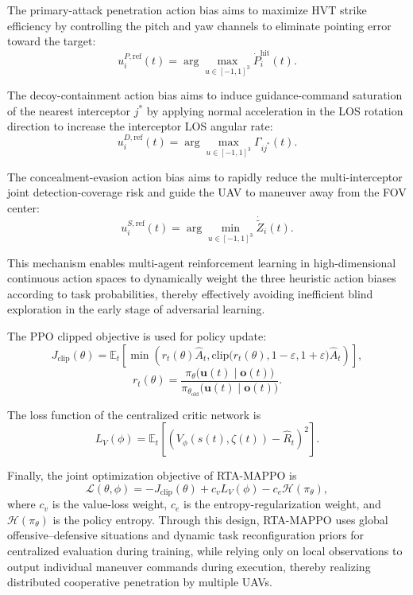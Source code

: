 \documentclass{cja}
\begin{document}
The primary-attack penetration action bias aims to maximize HVT strike efficiency by controlling the pitch and yaw channels to eliminate pointing error toward the target:
\begin{equation}
u_i^{P,\mathrm{ref}}(t) = \arg\max_{u \in [-1,1]^3} \dot{P}_i^{\mathrm{hit}}(t).
\end{equation}

The decoy-containment action bias aims to induce guidance-command saturation of the nearest interceptor $j^*$ by applying normal acceleration in the LOS rotation direction to increase the interceptor LOS angular rate:
\begin{equation}
u_i^{D,\mathrm{ref}}(t) = \arg\max_{u \in [-1,1]^3} \Gamma_{ij^*}(t).
\end{equation}

The concealment-evasion action bias aims to rapidly reduce the multi-interceptor joint detection-coverage risk and guide the UAV to maneuver away from the FOV center:
\begin{equation}
u_i^{S,\mathrm{ref}}(t) = \arg\min_{u \in [-1,1]^3} \dot{\widetilde Z}_i(t).
\end{equation}

This mechanism enables multi-agent reinforcement learning in high-dimensional continuous action spaces to dynamically weight the three heuristic action biases according to task probabilities, thereby effectively avoiding inefficient blind exploration in the early stage of adversarial learning.

The PPO clipped objective is used for policy update:
\begin{equation}
J_{\mathrm{clip}}(\theta)
=
\mathbb E_t
\left[
\min
\left(
r_t(\theta)\hat A_t,
\mathrm{clip}\bigl(r_t(\theta),1-\varepsilon,1+\varepsilon\bigr)\hat A_t
\right)
\right],
\end{equation}
\begin{equation}
r_t(\theta)
=
\frac{
\pi_{\theta}\bigl(\mathbf u(t)\mid \mathbf o(t)\bigr)
}{
\pi_{\theta_{\mathrm{old}}}\bigl(\mathbf u(t)\mid \mathbf o(t)\bigr)
}.
\end{equation}

The loss function of the centralized critic network is
\begin{equation}
L_V(\phi)
=
\mathbb E_t
\left[
\left(
V_{\phi}(s(t),\zeta(t))
-
\hat R_t
\right)^2
\right].
\end{equation}

Finally, the joint optimization objective of RTA-MAPPO is
\begin{equation}
\mathcal L(\theta,\phi)
=
-J_{\mathrm{clip}}(\theta)
+
c_v L_V(\phi)
-
c_e\mathcal H(\pi_{\theta}),
\end{equation}
where $c_v$ is the value-loss weight, $c_e$ is the entropy-regularization weight, and $\mathcal H(\pi_{\theta})$ is the policy entropy. Through this design, RTA-MAPPO uses global offensive--defensive situations and dynamic task reconfiguration priors for centralized evaluation during training, while relying only on local observations to output individual maneuver commands during execution, thereby realizing distributed cooperative penetration by multiple UAVs.
\end{document}
